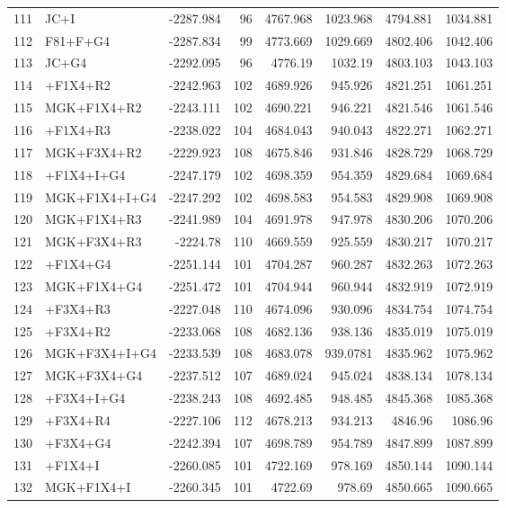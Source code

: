 \begin{longtable}{clrrrrrr}
	111 & JC+I & -2287.984 & 96 & 4767.968 & 1023.968 & 4794.881 & 1034.881 \\ 
	112 & F81+F+G4 & -2287.834 & 99 & 4773.669 & 1029.669 & 4802.406 & 1042.406 \\ 
	113 & JC+G4 & -2292.095 & 96 & 4776.19 & 1032.19 & 4803.103 & 1043.103 \\ 
	114 & \gy+F1X4+R2 & -2242.963 & 102 & 4689.926 & 945.926 & 4821.251 & 1061.251 \\ 
	115 & MGK+F1X4+R2 & -2243.111 & 102 & 4690.221 & 946.221 & 4821.546 & 1061.546 \\ 
	116 & \gy+F1X4+R3 & -2238.022 & 104 & 4684.043 & 940.043 & 4822.271 & 1062.271 \\ 
	117 & MGK+F3X4+R2 & -2229.923 & 108 & 4675.846 & 931.846 & 4828.729 & 1068.729 \\ 
	118 & \gy+F1X4+I+G4 & -2247.179 & 102 & 4698.359 & 954.359 & 4829.684 & 1069.684 \\ 
	119 & MGK+F1X4+I+G4 & -2247.292 & 102 & 4698.583 & 954.583 & 4829.908 & 1069.908 \\ 
	120 & MGK+F1X4+R3 & -2241.989 & 104 & 4691.978 & 947.978 & 4830.206 & 1070.206 \\ 
	121 & MGK+F3X4+R3 & -2224.78 & 110 & 4669.559 & 925.559 & 4830.217 & 1070.217 \\ 
	122 & \gy+F1X4+G4 & -2251.144 & 101 & 4704.287 & 960.287 & 4832.263 & 1072.263 \\ 
	123 & MGK+F1X4+G4 & -2251.472 & 101 & 4704.944 & 960.944 & 4832.919 & 1072.919 \\ 
	124 & \gy+F3X4+R3 & -2227.048 & 110 & 4674.096 & 930.096 & 4834.754 & 1074.754 \\ 
	125 & \gy+F3X4+R2 & -2233.068 & 108 & 4682.136 & 938.136 & 4835.019 & 1075.019 \\ 
	126 & MGK+F3X4+I+G4 & -2233.539 & 108 & 4683.078 & 939.0781 & 4835.962 & 1075.962 \\ 
	127 & MGK+F3X4+G4 & -2237.512 & 107 & 4689.024 & 945.024 & 4838.134 & 1078.134 \\ 
	128 & \gy+F3X4+I+G4 & -2238.243 & 108 & 4692.485 & 948.485 & 4845.368 & 1085.368 \\ 
	129 & \gy+F3X4+R4 & -2227.106 & 112 & 4678.213 & 934.213 & 4846.96 & 1086.96 \\ 
	130 & \gy+F3X4+G4 & -2242.394 & 107 & 4698.789 & 954.789 & 4847.899 & 1087.899 \\ 
	131 & \gy+F1X4+I & -2260.085 & 101 & 4722.169 & 978.169 & 4850.144 & 1090.144 \\ 
	132 & MGK+F1X4+I & -2260.345 & 101 & 4722.69 & 978.69 & 4850.665 & 1090.665 \\ 

\end{longtable}
